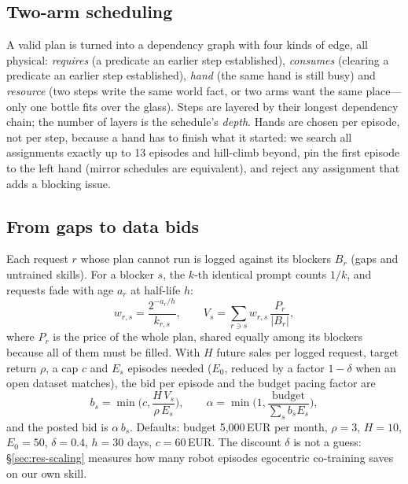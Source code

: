 \documentclass[10pt,twocolumn,letterpaper]{article}
\begin{document}
\subsection{Two-arm scheduling}\label{sec:sched}
A valid plan is turned into a dependency graph with four kinds of edge, all physical: \emph{requires} (a predicate an
earlier step established), \emph{consumes} (clearing a predicate an earlier step established), \emph{hand} (the same
hand is still busy) and \emph{resource} (two steps write the same world fact, or two arms want the same place---only
one bottle fits over the glass). Steps are layered by their longest dependency chain; the number of layers is the
schedule's \emph{depth}. Hands are chosen per episode, not per step, because a hand has to finish what it started: we
search all assignments exactly up to 13 episodes and hill-climb beyond, pin the first episode to the left hand (mirror
schedules are equivalent), and reject any assignment that adds a blocking issue.

\subsection{From gaps to data bids}\label{sec:bids}
Each request $r$ whose plan cannot run is logged against its blockers $B_r$ (gaps and untrained skills). For a blocker
$s$, the $k$-th identical prompt counts $1/k$, and requests fade with age $a_r$ at half-life $h$:
\begin{equation}
w_{r,s}=\frac{2^{-a_r/h}}{k_{r,s}},\qquad V_s=\sum_{r\ni s} w_{r,s}\,\frac{P_r}{|B_r|},
\end{equation}
where $P_r$ is the price of the whole plan, shared equally among its blockers because all of them must be filled.
With $H$ future sales per logged request, target return $\rho$, a cap $c$ and $E_s$ episodes needed ($E_0$, reduced by
a factor $1-\delta$ when an open dataset matches), the bid per episode and the budget pacing factor are
\begin{equation}
b_s=\min\!\Big(c,\frac{H\,V_s}{\rho\,E_s}\Big),\qquad \alpha=\min\!\Big(1,\frac{\text{budget}}{\sum_s b_sE_s}\Big),
\end{equation}
and the posted bid is $\alpha\,b_s$. Defaults: budget 5{,}000\,EUR per month, $\rho=3$, $H=10$, $E_0=50$,
$\delta=0.4$, $h=30$ days, $c=60$\,EUR. The discount $\delta$ is not a guess: \S\ref{sec:res-scaling} measures how
many robot episodes egocentric co-training saves on our own skill.

\end{document}

